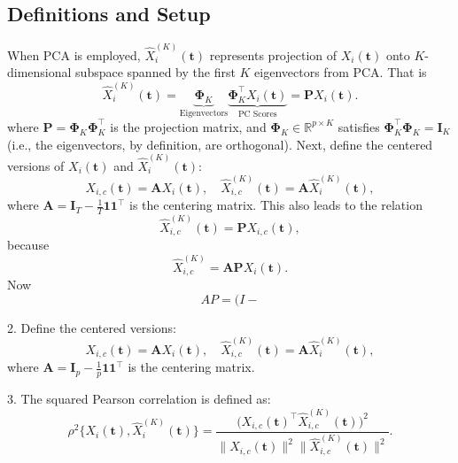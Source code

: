 \subsection*{Definitions and Setup}

When PCA is employed, $\widehat{X}^{(K)}_{i}(\mathbf{t})$ represents projection of $X_{i}(\mathbf{t})$ onto \( K \)-dimensional subspace spanned by the first $K$ eigenvectors from PCA. That is
$$
 \widehat{X}^{(K)}_{i} (\mathbf{t}) = \underbrace{\boldsymbol{\Phi}_K}_{\text{Eigenvectors}} \underbrace{\boldsymbol{\Phi}_K^\top X_i(\mathbf{t})}_{\text{PC Scores}}
 = \mathbf{P} X_i(\mathbf{t}).
$$
where \( \mathbf{P} = \bm{\Phi}_K \bm{\Phi}_K^\top \) is the projection matrix, and \( \bm{\Phi}_K \in \mathbb{R}^{p \times K} \) satisfies \( \bm{\Phi}_K^\top \bm{\Phi}_K = \mathbf{I}_K \) (i.e., the eigenvectors, by definition, are orthogonal).
Next, define the centered versions of $X_i(\mathbf{t})$ and $\widehat{X}^{(K)}_{i} (\mathbf{t})$:
\[
X_{i,c}(\mathbf{t}) = \mathbf{A} X_{i}(\mathbf{t}), \quad 
\widehat{X}^{(K)}_{i,c}(\mathbf{t}) = \mathbf{A} \widehat{X}^{(K)}_{i}(\mathbf{t}),
\]
where \( \mathbf{A} = \mathbf{I}_T - \frac{1}{T} \mathbf{1} \mathbf{1}^\top \) is the centering matrix.
This also leads to the relation
$$
\widehat{X}_{i,c}^{(K)} (\mathbf{t}) = \mathbf{P} X_{i,c}(\mathbf{t}),
$$
because 
$$
\widehat{X}_{i,c}^{(K)} = \mathbf{A} \mathbf{P}X_i(\mathbf{t}).
$$
Now 
$$
AP = (I - 
$$



2. Define the centered versions:
\[
X_{i,c}(\mathbf{t}) = \mathbf{A} X_{i}(\mathbf{t}), \quad 
\widehat{X}^{(K)}_{i,c}(\mathbf{t}) = \mathbf{A} \widehat{X}^{(K)}_{i}(\mathbf{t}),
\]
where \( \mathbf{A} = \mathbf{I}_p - \frac{1}{p} \mathbf{1} \mathbf{1}^\top \) is the centering matrix.

3. The squared Pearson correlation is defined as:
\[
\rho^2 \bigg\{ X_{i}(\mathbf{t}), \widehat{X}^{(K)}_{i} (\mathbf{t}) \bigg\} 
= \frac{\bigg( X_{i,c}(\mathbf{t})^\top \widehat{X}^{(K)}_{i,c}(\mathbf{t}) \bigg)^2}
{\bigg\| X_{i,c}(\mathbf{t}) \bigg\|^2 \bigg\| \widehat{X}^{(K)}_{i,c}(\mathbf{t}) \bigg\|^2}.
\]

